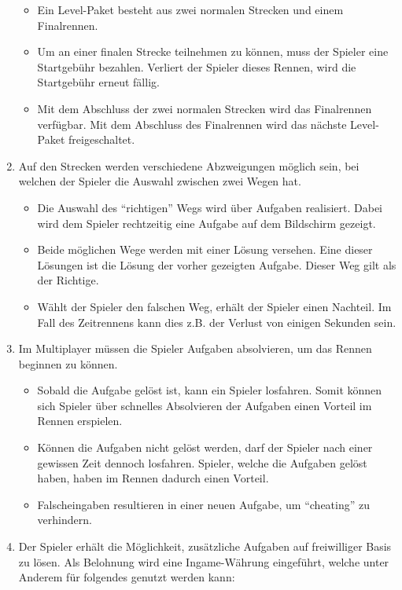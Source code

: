 \begin{enumerate}
		\begin{itemize}
			\item{Ein Level-Paket besteht aus zwei normalen Strecken und einem Finalrennen.}
			\item{Um an einer finalen Strecke teilnehmen zu können, muss der Spieler eine Startgebühr bezahlen. Verliert der Spieler dieses Rennen, wird die Startgebühr erneut fällig.}
			\item{Mit dem Abschluss der zwei normalen Strecken wird das Finalrennen verfügbar. Mit dem Abschluss des Finalrennen wird das nächste Level-Paket freigeschaltet.}
		\end{itemize}
		\item{Auf den Strecken werden verschiedene Abzweigungen möglich sein, bei welchen der Spieler die Auswahl zwischen zwei Wegen hat.}
		\begin{itemize}
			\item{Die Auswahl des \enquote{richtigen} Wegs wird über Aufgaben realisiert. Dabei wird dem Spieler rechtzeitig eine Aufgabe auf dem Bildschirm gezeigt.}
			\item{Beide möglichen Wege werden mit einer Lösung versehen. Eine dieser Lösungen ist die Lösung der vorher gezeigten Aufgabe. Dieser Weg gilt als der Richtige.}
			\item{Wählt der Spieler den falschen Weg, erhält der Spieler einen Nachteil. Im Fall des Zeitrennens kann dies z.B. der Verlust von einigen Sekunden sein.}
		\end{itemize}
		\item{Im Multiplayer müssen die Spieler Aufgaben absolvieren, um das Rennen beginnen zu können.}
			\begin{itemize}
				\item{Sobald die Aufgabe gelöst ist, kann ein Spieler losfahren. Somit können sich Spieler über schnelles Absolvieren der Aufgaben einen Vorteil im Rennen erspielen.}
				\item{Können die Aufgaben nicht gelöst werden, darf der Spieler nach einer gewissen Zeit dennoch losfahren. Spieler, welche die Aufgaben gelöst haben, haben im Rennen dadurch einen Vorteil.}
				\item{Falscheingaben resultieren in einer neuen Aufgabe, um \enquote{cheating} zu verhindern.}
			\end{itemize}
		\item{Der Spieler erhält die Möglichkeit, zusätzliche Aufgaben auf freiwilliger Basis zu lösen. Als Belohnung wird eine Ingame-Währung eingeführt, welche unter Anderem für folgendes genutzt werden kann:}

\end{enumerate}
